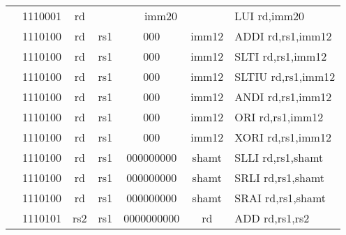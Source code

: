 \begin{table}[p]
\begin{small}
\begin{center}
\begin{tabular}{rcccccccccccl}
&
\multicolumn{2}{|c|}{1110001} &
\multicolumn{1}{c|}{rd} &
\multicolumn{8}{c|}{imm20} & LUI rd,imm20 \\
\cline{2-12}
  

&
\multicolumn{2}{|c|}{1110100} &
\multicolumn{1}{c|}{rd} &
\multicolumn{1}{c|}{rs1} &
\multicolumn{2}{c|}{000} &
\multicolumn{5}{c|}{imm12} & ADDI rd,rs1,imm12 \\
\cline{2-12}
  

&
\multicolumn{2}{|c|}{1110100} &
\multicolumn{1}{c|}{rd} &
\multicolumn{1}{c|}{rs1} &
\multicolumn{2}{c|}{000} &
\multicolumn{5}{c|}{imm12} & SLTI rd,rs1,imm12 \\
\cline{2-12}
  

&
\multicolumn{2}{|c|}{1110100} &
\multicolumn{1}{c|}{rd} &
\multicolumn{1}{c|}{rs1} &
\multicolumn{2}{c|}{000} &
\multicolumn{5}{c|}{imm12} & SLTIU rd,rs1,imm12 \\
\cline{2-12}
  

&
\multicolumn{2}{|c|}{1110100} &
\multicolumn{1}{c|}{rd} &
\multicolumn{1}{c|}{rs1} &
\multicolumn{2}{c|}{000} &
\multicolumn{5}{c|}{imm12} & ANDI rd,rs1,imm12 \\
\cline{2-12}
  

&
\multicolumn{2}{|c|}{1110100} &
\multicolumn{1}{c|}{rd} &
\multicolumn{1}{c|}{rs1} &
\multicolumn{2}{c|}{000} &
\multicolumn{5}{c|}{imm12} & ORI rd,rs1,imm12 \\
\cline{2-12}
  

&
\multicolumn{2}{|c|}{1110100} &
\multicolumn{1}{c|}{rd} &
\multicolumn{1}{c|}{rs1} &
\multicolumn{2}{c|}{000} &
\multicolumn{5}{c|}{imm12} & XORI rd,rs1,imm12 \\
\cline{2-12}
  

&
\multicolumn{2}{|c|}{1110100} &
\multicolumn{1}{c|}{rd} &
\multicolumn{1}{c|}{rs1} &
\multicolumn{5}{c|}{000000000} &
\multicolumn{2}{c|}{shamt} & SLLI rd,rs1,shamt \\
\cline{2-12}
  

&
\multicolumn{2}{|c|}{1110100} &
\multicolumn{1}{c|}{rd} &
\multicolumn{1}{c|}{rs1} &
\multicolumn{5}{c|}{000000000} &
\multicolumn{2}{c|}{shamt} & SRLI rd,rs1,shamt \\
\cline{2-12}
  

&
\multicolumn{2}{|c|}{1110100} &
\multicolumn{1}{c|}{rd} &
\multicolumn{1}{c|}{rs1} &
\multicolumn{5}{c|}{000000000} &
\multicolumn{2}{c|}{shamt} & SRAI rd,rs1,shamt \\
\cline{2-12}
  

&
\multicolumn{2}{|c|}{1110101} &
\multicolumn{1}{c|}{rs2} &
\multicolumn{1}{c|}{rs1} &
\multicolumn{6}{c|}{0000000000} &
\multicolumn{1}{c|}{rd} & ADD rd,rs1,rs2 \\
\cline{2-12}
  


\end{tabular}
\end{center}
\end{small}
\end{table}
